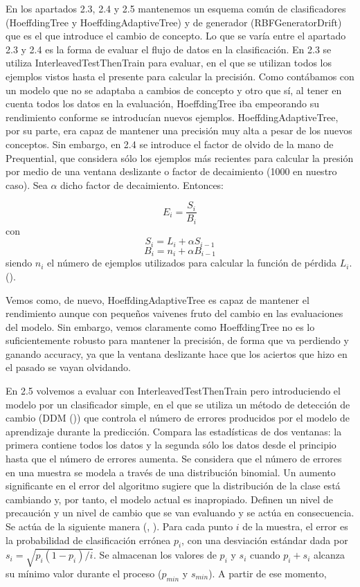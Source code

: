 En los apartados 2.3, 2.4 y 2.5 mantenemos un esquema común de clasificadores (HoeffdingTree y HoeffdingAdaptiveTree) y de generador (RBFGeneratorDrift) que es el que introduce el cambio de concepto. Lo que se varía entre el apartado 2.3 y 2.4 es la forma de evaluar el flujo de datos en la clasificación. En 2.3 se utiliza InterleavedTestThenTrain para evaluar, en el que se utilizan todos los ejemplos vistos hasta el presente para calcular la precisión. Como contábamos con un modelo que no se adaptaba a cambios de concepto y otro que sí, al tener en cuenta todos los datos en la evaluación, HoeffdingTree iba empeorando su rendimiento conforme se introducían nuevos ejemplos. HoeffdingAdaptiveTree, por su parte, era capaz de mantener una precisión muy alta a pesar de los nuevos conceptos. Sin embargo, en 2.4 se introduce el factor de olvido de la mano de Prequential, que considera sólo los ejemplos más recientes para calcular la presión por medio de una ventana deslizante o factor de decaimiento (1000 en nuestro caso).  Sea $\alpha$ dicho factor de decaimiento. Entonces:

$$E_i = \frac{S_i}{B_i}$$
con
$$S_i = L_i + \alpha S_{i-1}$$
$$B_i = n_i + \alpha B_{i-1}$$
siendo $n_i$ el número de ejemplos utilizados para calcular la función de pérdida $L_i$. (\cite{moa-manual}).


Vemos como, de nuevo, HoeffdingAdaptiveTree es capaz de mantener el rendimiento aunque con pequeños vaivenes fruto del cambio en las evaluaciones del modelo. Sin embargo, vemos claramente como HoeffdingTree no es lo suficientemente robusto para mantener la precisión, de forma que va perdiendo y ganando accuracy, ya que la ventana deslizante hace que los aciertos que hizo en el pasado se vayan olvidando.

En 2.5 volvemos a evaluar con InterleavedTestThenTrain pero introduciendo el modelo por un clasificador simple, en el que se utiliza un método de detección de cambio (DDM (\cite{ddm})) que controla el número de errores producidos por el modelo de aprendizaje durante la predicción. Compara las estadísticas de dos ventanas: la primera contiene todos los datos y la segunda sólo los datos desde el principio hasta que el número de errores aumenta. Se considera que el número de errores en una muestra se modela a través de una distribución binomial. Un aumento significante en el error del algoritmo sugiere que la distribución de la clase está cambiando y, por tanto, el modelo actual es inapropiado. Definen un nivel de precaución y un nivel de cambio que se van evaluando y se actúa en consecuencia. Se actúa de la siguiente manera (\cite{moa-manual}, \cite{ddm}). Para cada punto $i$ de la muestra, el error es la probabilidad de clasificación errónea $p_i$, con una desviación estándar dada por $s_i = \sqrt{p_i (1-p_i)/i}$. Se almacenan los valores de $p_i$ y $s_i$ cuando $p_i+s_i$ alcanza su mínimo valor durante el proceso ($p_{min}$ y $s_{min}$). A partir de ese momento,

